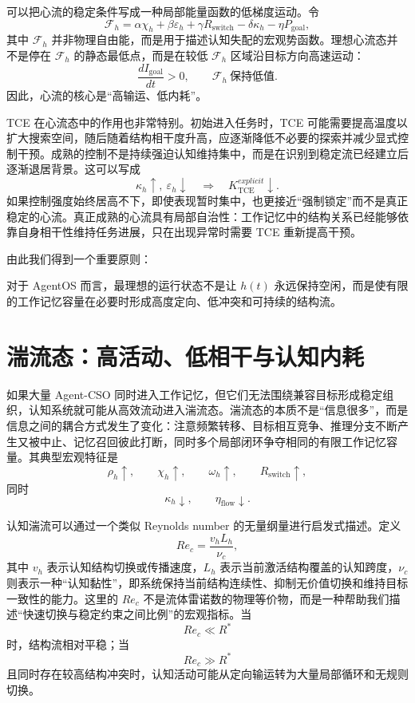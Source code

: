 可以把心流的稳定条件写成一种局部能量函数的低梯度运动。令
\[
\mathcal F_h
=
\alpha \chi_h
+
\beta \varepsilon_h
+
\gamma R_{\mathrm{switch}}
-
\delta \kappa_h
-
\eta P_{\mathrm{goal}},
\]
其中 $\mathcal F_h$ 并非物理自由能，而是用于描述认知失配的宏观势函数。理想心流态并不是停在 $\mathcal F_h$ 的静态最低点，而是在较低 $\mathcal F_h$ 区域沿目标方向高速运动：
\[
\frac{dI_{\mathrm{goal}}}{dt}>0,
\qquad
\mathcal F_h\ \text{保持低值}.
\]
因此，心流的核心是“高输运、低内耗”。

TCE 在心流态中的作用也非常特别。初始进入任务时，TCE 可能需要提高温度以扩大搜索空间，随后随着结构相干度升高，应逐渐降低不必要的探索并减少显式控制干预。成熟的控制不是持续强迫认知维持集中，而是在识别到稳定流已经建立后逐渐退居背景。这可以写成
\[
\kappa_h\uparrow,\ 
\varepsilon_h\downarrow
\quad\Rightarrow\quad
K_{\mathrm{TCE}}^{explicit}\downarrow.
\]
如果控制强度始终居高不下，即使表现暂时集中，也更接近“强制锁定”而不是真正稳定的心流。真正成熟的心流具有局部自治性：工作记忆中的结构关系已经能够依靠自身相干性维持任务进展，只在出现异常时需要 TCE 重新提高干预。

由此我们得到一个重要原则：
\begin{statementbox}
\centering
{}
\end{statementbox}
对于 AgentOS 而言，最理想的运行状态不是让 $h(t)$ 永远保持空闲，而是使有限的工作记忆容量在必要时形成高度定向、低冲突和可持续的结构流。

\section{湍流态：高活动、低相干与认知内耗}

如果大量 Agent-CSO 同时进入工作记忆，但它们无法围绕兼容目标形成稳定组织，认知系统就可能从高效流动进入湍流态。湍流态的本质不是“信息很多”，而是信息之间的耦合方式发生了变化：注意频繁转移、目标相互竞争、推理分支不断产生又被中止、记忆召回彼此打断，同时多个局部闭环争夺相同的有限工作记忆容量。其典型宏观特征是
\[
\rho_h\uparrow,\qquad
\chi_h\uparrow,\qquad
\omega_h\uparrow,\qquad
R_{\mathrm{switch}}\uparrow,
\]
同时
\[
\kappa_h\downarrow,\qquad
\eta_{\mathrm{flow}}\downarrow.
\]

认知湍流可以通过一个类似 Reynolds number 的无量纲量进行启发式描述。定义
\[
Re_c
=
\frac{
v_h L_h
}{
\nu_c
},
\]
其中 $v_h$ 表示认知结构切换或传播速度，$L_h$ 表示当前激活结构覆盖的认知跨度，$\nu_c$ 则表示一种“认知黏性”，即系统保持当前结构连续性、抑制无价值切换和维持目标一致性的能力。这里的 $Re_c$ 不是流体雷诺数的物理等价物，而是一种帮助我们描述“快速切换与稳定约束之间比例”的宏观指标。当
\[
Re_c\ll R^\ast
\]
时，结构流相对平稳；当
\[
Re_c\gg R^\ast
\]
且同时存在较高结构冲突时，认知活动可能从定向输运转为大量局部循环和无规则切换。

